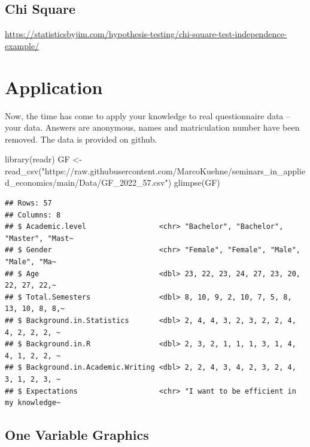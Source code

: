 \documentclass[
]{book}
\newenvironment{Shaded}{\begin{snugshade}}{\end{snugshade}}
\newcommand{\FunctionTok}[1]{\textcolor[rgb]{0.00,0.00,0.00}{#1}}
\newcommand{\NormalTok}[1]{#1}
\newcommand{\OtherTok}[1]{\textcolor[rgb]{0.56,0.35,0.01}{#1}}
\newcommand{\StringTok}[1]{\textcolor[rgb]{0.31,0.60,0.02}{#1}}
\begin{document}
\hypertarget{chi-square}{%
\subsection{Chi Square}\label{chi-square}}

\url{https://statisticsbyjim.com/hypothesis-testing/chi-square-test-independence-example/}

\hypertarget{application}{%
\section{Application}\label{application}}

Now, the time has come to apply your knowledge to real questionnaire data -- your data. Answers are anonymous, names and matriculation number have been removed. The data is provided on github.

\begin{Shaded}
\begin{Highlighting}[]
\FunctionTok{library}\NormalTok{(readr)}
\NormalTok{GF }\OtherTok{\textless{}{-}} \FunctionTok{read\_csv}\NormalTok{(}\StringTok{"https://raw.githubusercontent.com/MarcoKuehne/seminars\_in\_applied\_economics/main/Data/GF\_2022\_57.csv"}\NormalTok{)}
\FunctionTok{glimpse}\NormalTok{(GF)}
\end{Highlighting}
\end{Shaded}

\begin{verbatim}
## Rows: 57
## Columns: 8
## $ Academic.level                 <chr> "Bachelor", "Bachelor", "Master", "Mast~
## $ Gender                         <chr> "Female", "Female", "Male", "Male", "Ma~
## $ Age                            <dbl> 23, 22, 23, 24, 27, 23, 20, 22, 27, 22,~
## $ Total.Semesters                <dbl> 8, 10, 9, 2, 10, 7, 5, 8, 13, 10, 8, 8,~
## $ Background.in.Statistics       <dbl> 2, 4, 4, 3, 2, 3, 2, 2, 4, 4, 2, 2, 2, ~
## $ Background.in.R                <dbl> 2, 3, 2, 1, 1, 1, 3, 1, 4, 4, 1, 2, 2, ~
## $ Background.in.Academic.Writing <dbl> 2, 2, 4, 3, 4, 2, 3, 2, 4, 3, 1, 2, 3, ~
## $ Expectations                   <chr> "I want to be efficient in my knowledge~
\end{verbatim}

\hypertarget{one-variable-graphics}{%
\subsection{One Variable Graphics}\label{one-variable-graphics}}
\end{document}
